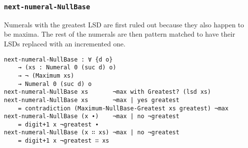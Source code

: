 \documentclass[\main/thesis.tex]{subfiles}
\begin{document}
\begin{center}
    \begin{adjustbox}{max width=\textwidth}
    \end{adjustbox}
\end{center}

\subsubsection{{\lstinline|next-numeral-NullBase|}}

Numerals with the greatest LSD are first ruled out because they also happen
to be maxima. The rest of the numerals are then pattern matched to have their
LSDs replaced with an incremented one.

\begin{lstlisting}
next-numeral-NullBase : ∀ {d o}
    → (xs : Numeral 0 (suc d) o)
    → ¬ (Maximum xs)
    → Numeral 0 (suc d) o
next-numeral-NullBase xs       ¬max with Greatest? (lsd xs)
next-numeral-NullBase xs       ¬max | yes greatest
    = contradiction (Maximum-NullBase-Greatest xs greatest) ¬max
next-numeral-NullBase (x ∙)    ¬max | no ¬greatest
    = digit+1 x ¬greatest ∙
next-numeral-NullBase (x ∷ xs) ¬max | no ¬greatest
    = digit+1 x ¬greatest ∷ xs
\end{lstlisting}
\end{document}
